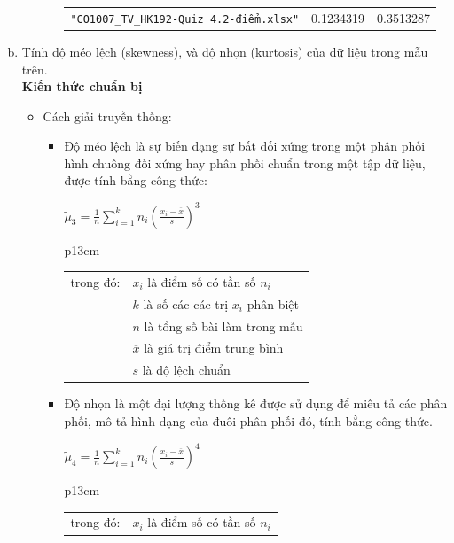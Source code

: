 \documentclass[a4paper]{article}
\theoremstyle{definition}
\begin{document}
\begin{enumerate}[a)]
\begin{itemize}
\begin{itemize}
\begin{center}
\begin{tabular}{l c c}
                     \texttt{"CO1007\_TV\_HK192-Quiz 4.2-điểm.xlsx"} & 0.1234319 & 0.3513287\\ 
                \end{tabular}
            \end{center}
        \end{itemize}
    \end{itemize}
    \bf\item  Tính độ méo lệch (skewness), và độ nhọn (kurtosis) của dữ liệu trong mẫu trên.\\[6pt]
    \bf Kiến thức chuẩn bị\normalfont
    \begin{itemize}
        \item Cách giải truyền thống:
        \begin{itemize}
            \item Độ méo lệch là sự biến dạng sự bất đối xứng trong một phân phối hình chuông đối xứng hay phân phối chuẩn trong một tập dữ liệu, được tính bằng công thức:
            \begin{center}
                $\tilde{\mu}_3 = \frac{1}{n} \sum \limits_{i=1}^{k} n_i (\frac{x_i - \overline{x}}{s})^3$
                \begin{tabular}{p{13cm}}
                    \begin{tabular}{l l}
                        trong đó: & $x_i$ là điểm số có tần số $n_i$\\
                        & $k$ là số các các trị $x_i$ phân biệt\\
                        & $n$ là tổng số bài làm trong mẫu\\
                        & $\overline{x}$ là giá trị điểm trung bình\\
                        & $s$ là độ lệch chuẩn
                    \end{tabular}
                \end{tabular}
            \end{center}
            \item Độ nhọn là một đại lượng thống kê được sử dụng để miêu tả các phân phối, mô tả hình dạng của đuôi phân phối đó, tính bằng công thức.
            \begin{center}
                $\tilde{\mu}_4 = \frac{1}{n} \sum \limits_{i=1}^{k} n_i (\frac{x_i - \overline{x}}{s})^4$
                \begin{tabular}{p{13cm}}
                    \begin{tabular}{l l}
                        trong đó: & $x_i$ là điểm số có tần số $n_i$\\

\end{tabular}
\end{tabular}
\end{center}
\end{itemize}
\end{itemize}
\end{enumerate}
\end{document}
